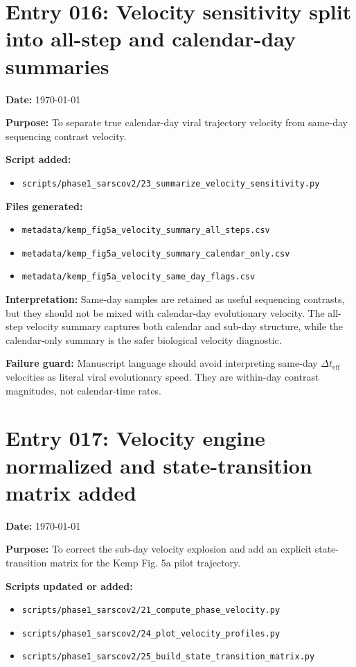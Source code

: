 \section*{Entry 016: Velocity sensitivity split into all-step and calendar-day summaries}

\textbf{Date:} \today

\textbf{Purpose:} To separate true calendar-day viral trajectory velocity from same-day sequencing contrast velocity.

\textbf{Script added:}
\begin{itemize}
    \item \texttt{scripts/phase1\_sarscov2/23\_summarize\_velocity\_sensitivity.py}
\end{itemize}

\textbf{Files generated:}
\begin{itemize}
    \item \texttt{metadata/kemp\_fig5a\_velocity\_summary\_all\_steps.csv}
    \item \texttt{metadata/kemp\_fig5a\_velocity\_summary\_calendar\_only.csv}
    \item \texttt{metadata/kemp\_fig5a\_velocity\_same\_day\_flags.csv}
\end{itemize}

\textbf{Interpretation:} Same-day samples are retained as useful sequencing contrasts, but they should not be mixed with calendar-day evolutionary velocity. The all-step velocity summary captures both calendar and sub-day structure, while the calendar-only summary is the safer biological velocity diagnostic.

\textbf{Failure guard:} Manuscript language should avoid interpreting same-day \(\Delta t_{\mathrm{eff}}\) velocities as literal viral evolutionary speed. They are within-day contrast magnitudes, not calendar-time rates.


\section*{Entry 017: Velocity engine normalized and state-transition matrix added}

\textbf{Date:} \today

\textbf{Purpose:} To correct the sub-day velocity explosion and add an explicit state-transition matrix for the Kemp Fig. 5a pilot trajectory.

\textbf{Scripts updated or added:}
\begin{itemize}
    \item \texttt{scripts/phase1\_sarscov2/21\_compute\_phase\_velocity.py}
    \item \texttt{scripts/phase1\_sarscov2/24\_plot\_velocity\_profiles.py}
    \item \texttt{scripts/phase1\_sarscov2/25\_build\_state\_transition\_matrix.py}
\end{itemize}

